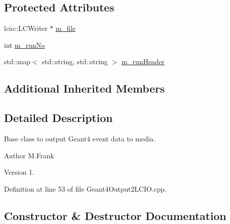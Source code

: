 \subsection*{Protected Attributes}
\begin{DoxyCompactItemize}
\item 
lcio\+::\+L\+C\+Writer $\ast$ \hyperlink{class_d_d4hep_1_1_simulation_1_1_geant4_output2_l_c_i_o_a53ad4cd77ad5b3b95105cee1ac2ca6f8}{m\+\_\+file}
\item 
int \hyperlink{class_d_d4hep_1_1_simulation_1_1_geant4_output2_l_c_i_o_a6f4cb683c0f3b248ee518aa9ca7cf0c6}{m\+\_\+run\+No}
\item 
std\+::map$<$ std\+::string, std\+::string $>$ \hyperlink{class_d_d4hep_1_1_simulation_1_1_geant4_output2_l_c_i_o_ad4dec33a908a569451f8f51eb3954eba}{m\+\_\+run\+Header}
\end{DoxyCompactItemize}
\subsection*{Additional Inherited Members}


\subsection{Detailed Description}
Base class to output Geant4 event data to media. 

\begin{DoxyAuthor}{Author}
M.\+Frank 
\end{DoxyAuthor}
\begin{DoxyVersion}{Version}
1. 
\end{DoxyVersion}


Definition at line 53 of file Geant4\+Output2\+L\+C\+I\+O.\+cpp.



\subsection{Constructor \& Destructor Documentation}
\hypertarget{class_d_d4hep_1_1_simulation_1_1_geant4_output2_l_c_i_o_a39a100c6a5849a6371e646946afe3c43}{}\label{class_d_d4hep_1_1_simulation_1_1_geant4_output2_l_c_i_o_a39a100c6a5849a6371e646946afe3c43} 
